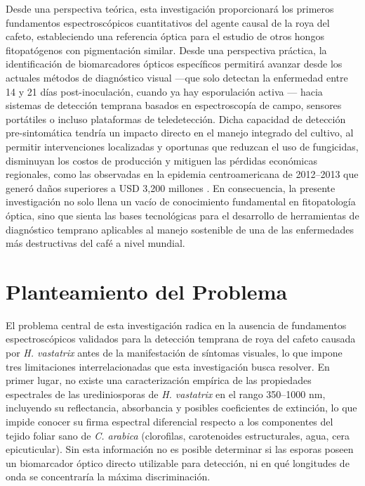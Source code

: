 \documentclass[12pt, a4paper]{article}
\begin{document}
	Desde una perspectiva teórica, esta investigación proporcionará los primeros fundamentos espectroscópicos cuantitativos del agente causal de la roya del cafeto, estableciendo una referencia óptica para el estudio de otros hongos fitopatógenos con pigmentación similar. Desde una perspectiva práctica, la identificación de biomarcadores ópticos específicos permitirá avanzar desde los actuales métodos de diagnóstico visual —que solo detectan la enfermedad entre 14 y 21 días post-inoculación, cuando ya hay esporulación activa \parencite{Talhinhas2017}— hacia sistemas de detección temprana basados en espectroscopía de campo, sensores portátiles o incluso plataformas de teledetección. Dicha capacidad de detección pre-sintomática tendría un impacto directo en el manejo integrado del cultivo, al permitir intervenciones localizadas y oportunas que reduzcan el uso de fungicidas, disminuyan los costos de producción y mitiguen las pérdidas económicas regionales, como las observadas en la epidemia centroamericana de 2012–2013 que generó daños superiores a USD 3,200 millones \parencite{Avelino2015}. En consecuencia, la presente investigación no solo llena un vacío de conocimiento fundamental en fitopatología óptica, sino que sienta las bases tecnológicas para el desarrollo de herramientas de diagnóstico temprano aplicables al manejo sostenible de una de las enfermedades más destructivas del café a nivel mundial.
	
	\section{Planteamiento del Problema}
	
	El problema central de esta investigación radica en la ausencia de fundamentos espectroscópicos validados para la detección temprana de roya del cafeto causada por \textit{H. vastatrix} antes de la manifestación de síntomas visuales, lo que impone tres limitaciones interrelacionadas que esta investigación busca resolver. En primer lugar, no existe una caracterización empírica de las propiedades espectrales de las urediniosporas de \textit{H. vastatrix} en el rango 350–1000 nm, incluyendo su reflectancia, absorbancia y posibles coeficientes de extinción, lo que impide conocer su firma espectral diferencial respecto a los componentes del tejido foliar sano de \textit{C. arabica} (clorofilas, carotenoides estructurales, agua, cera epicuticular). Sin esta información no es posible determinar si las esporas poseen un biomarcador óptico directo utilizable para detección, ni en qué longitudes de onda se concentraría la máxima discriminación. 
	
\end{document}
